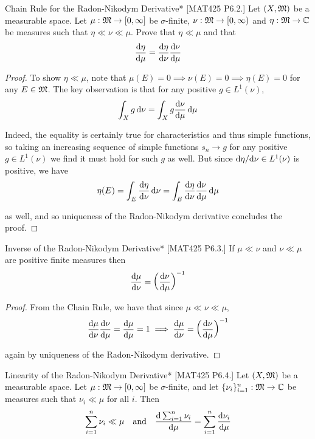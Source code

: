 \begin{problem}{Chain Rule for the Radon-Nikodym Derivative}*
    [MAT425 P6.2.] Let \((X, \mathfrak{M})\) be a measurable space. Let \(\mu : \mathfrak{M} \to [0, \infty]\) be \(\sigma\)-finite, \(\nu : \mathfrak{M} \to [0, \infty)\) and \(\eta : \mathfrak{M} \to \mathbb{C}\) be measures such that \(\eta \ll \nu \ll \mu\). Prove that \(\eta \ll \mu\) and that 
    \[
        \frac{\mathrm{d}\eta}{\mathrm{d}\mu} = \frac{\mathrm{d}\eta}{\mathrm{d}\nu} \frac{\mathrm{d}\nu}{\mathrm{d}\mu}
    \]
\end{problem}

\begin{proof}
    To show \(\eta \ll \mu\), note that \(\mu(E) = 0 \implies \nu(E) = 0 \implies \eta(E) = 0\) for any \(E \in \mathfrak{M}\). The key observation is that for any positive \(g \in L^1(\nu)\), 
    \[
        \int_X g \, \mathrm{d}\nu = \int_X g \frac{\mathrm{d}\nu}{\mathrm{d}\mu} \, \mathrm{d}\mu
    \]

    Indeed, the equality is certainly true for characteristics and thus simple functions, so taking an increasing sequence of simple functions \(s_n \to g\) for any positive \(g \in L^1(\nu)\) we find it must hold for such \(g\) as well. But since \(\mathrm{d}\eta / \mathrm{d}\nu \in L^1(\nu)\) is positive, we have 
    \[
        \eta(E) = \int_E \frac{\mathrm{d}\eta}{\mathrm{d}\nu} \, \mathrm{d}\nu = \int_E \frac{\mathrm{d}\eta}{\mathrm{d}\nu} \frac{\mathrm{d}\nu}{\mathrm{d}\mu} \, \mathrm{d}\mu
    \]

    as well, and so uniqueness of the Radon-Nikodym derivative concludes the proof. 
\end{proof}

\begin{problem}{Inverse of the Radon-Nikodym Derivative}*
    [MAT425 P6.3.] If \(\mu \ll \nu\) and \(\nu \ll \mu\) are positive finite measures then 
    \[
        \frac{\mathrm{d}\mu}{\mathrm{d}\nu} = \left( \frac{\mathrm{d}\nu}{\mathrm{d}\mu} \right)^{-1}
    \]
\end{problem}

\begin{proof}
    From the Chain Rule, we have that since \(\mu \ll \nu \ll \mu\), 
    \[
        \frac{\mathrm{d}\mu}{\mathrm{d}\nu}\frac{\mathrm{d}\nu}{\mathrm{d}\mu} = \frac{\mathrm{d}\mu}{\mathrm{d}\mu} = 1
        \implies 
        \frac{\mathrm{d}\mu}{\mathrm{d}\nu} = \left( \frac{\mathrm{d}\nu}{\mathrm{d}\mu} \right)^{-1} 
    \]

    again by uniqueness of the Radon-Nikodym derivative. 
\end{proof}

\begin{problem}{Linearity of the Radon-Nikodym Derivative}*
    [MAT425 P6.4.] Let \((X, \mathfrak{M})\) be a measurable space. Let \(\mu : \mathfrak{M} \to [0, \infty]\) be \(\sigma\)-finite, and let \(\{\nu_i\}_{i=1}^n : \mathfrak{M} \to \mathbb{C}\) be measures such that \(\nu_i \ll \mu\) for all \(i\). Then 
    \[
        \sum_{i=1}^n \nu_i \ll \mu
        \quad \text{and} \quad 
        \frac{\mathrm{d} \sum_{i=1}^n \nu_i}{\mathrm{d} \mu} = \sum_{i=1}^n \frac{\mathrm{d} \nu_i}{\mathrm{d}\mu}
    \]
\end{problem}

